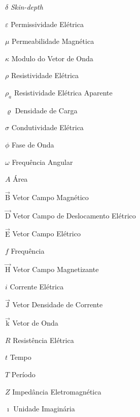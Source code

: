\documentclass[12pt,twoside,oneright,a4paper,chapter=TITLE,english,brazil]{unipampa}
\newcommand{\en}[1]{\textit{#1}}
\newcommand{\vetor}[1]{\vec{\textrm{#1}}}
\begin{document}
\begin{simbolos}
    \begin{multicols}{2}
    \item[$\delta$]                 \en{Skin-depth}
    \item[$\varepsilon$]             Permissividade Elétrica
    \item[$\mu$]                     Permeabilidade Magnética
    \item[$\kappa$]                  Modulo do Vetor de Onda
    \item[$\rho$]                    Resistividade Elétrica
    \item[$\rho_a$]                  Resistividade Elétrica Aparente
    \item[$\varrho$]                 Densidade de Carga
    \item[$\sigma$]                  Condutividade Elétrica
    \item[$\phi$]                    Fase de Onda
    \item[$\omega$]                  Frequência Angular
    \item[$A$]                       Área
    \item[$\vetor{B}$]               Vetor Campo Magnético
    \item[$\vetor{D}$]               Vetor Campo de Deslocamento Elétrico
    \item[$\vetor{E}$]               Vetor Campo Elétrico
    \item[$f$]                       Frequência
    \item[$\vetor{H}$]               Vetor Campo Magnetizante
    \item[$i$]                       Corrente Elétrica
    \item[$\vetor{J}$]               Vetor Densidade de Corrente
    \item[$\vetor{k}$]               Vetor de Onda
    \item[$R$]                       Resistência Elétrica
    \item[$t$]                       Tempo
    \item[$T$]                       Período
    \item[$Z$]                       Impedância Eletromagnética  
    \item[$\imath$]                  Unidade Imaginária

\end{multicols}
\end{simbolos}
\end{document}

